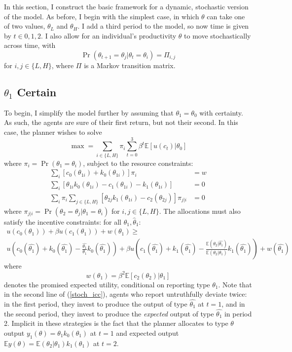 \documentclass[11pt]{article}
\newcommand{\ev}{\mathbb{E}}
\begin{document}
In this section, I construct the basic framework for a dynamic, stochastic version of the model. As before, I begin with the simplest case, in which \( \theta \) can take one of two values, \( \theta_L \) and \( \theta_H \). I add a third period to the model, so now time is given by \( t\in 0, 1, 2 \). I also allow for an individual's productivity \( \theta \) to move stochastically across time, with
\[ \Pr(\theta_{t+1} = \theta_j | \theta_t = \theta_i) = \Pi_{i,j} \]
for \( i,j\in\{L,H\} \), where \( \Pi \) is a Markov transition matrix. 

\subsection{\( \theta_1 \) Certain}

To begin, I simplify the model further by assuming that \( \theta_1 = \theta_0 \) with certainty. As such, the agents are sure of their first return, but not their second. In this case, the planner wishes to solve 
\begin{equation}
    \max = \sum_{i\in\{L,H\}} \pi_i \sum_{t = 0}^{3}\beta^t\ev [u(c_t) | \theta_0]
\end{equation}
where \( \pi_i = \Pr(\theta_1 = \theta_i) \), subject to the resource constraints:
\begin{align}
    \sum_i [c_0(\theta_{1i}) + k_0(\theta_{1i})]\pi_i &= w \\
    \sum_i [\theta_{1i}k_0(\theta_{1i}) - c_1(\theta_{1i}) - k_1(\theta_{1i})] &= 0 \\
    \sum_i \pi_i \sum_{j\in\{L,H\}}[\theta_{2j}k_1(\theta_{1i}) - c_2(\theta_{2j})]\pi_{j|i} &= 0
\end{align}
where \( \pi_{j|i} = \Pr(\theta_2 = \theta_j | \theta_1 = \theta_i) \) for \( i,j\in\{L,H\} \). The allocations must also satisfy the incentive constraints: for all \( \theta_1, \hat{\theta}_1 \): 
\begin{multline}
    u(c_0(\theta_1)) + \beta u(c_1(\theta_1)) + w(\theta_1) \geq \\
    u\left(c_0(\hat{\theta_1}) + k_0(\hat{\theta_1}) - \frac{\hat{\theta_1}}{\theta_1}k_0(\hat{\theta_1})\right) + \beta u\left( c_1(\hat{\theta_1}) + k_1(\hat{\theta_1}) - \frac{\ev(\theta_2|\hat{\theta_1})}{\ev(\theta_2 | \theta_1)}k_1(\hat{\theta_1}) \right) + w(\hat{\theta_1}) \label{stoch_icc}
\end{multline}
where 
\begin{equation}
    w(\theta_1) = \beta^2 \ev[c_2(\theta_2) | \theta_1]
\end{equation}
denotes the promised expected utility, conditional on reporting type \( \theta_1 \). Note that in the second line of (\ref{stoch_icc}), agents who report untruthfully deviate twice: in the first period, they invest to produce the output of type \( \hat{\theta_1} \) at \( t = 1 \), and in the second period, they invest to produce the \textit{expected} output of type \( \hat{\theta_1} \) in period 2. Implicit in these strategies is the fact that the planner allocates to type \( \theta \) output \( y_1(\theta) = \theta_1 k_0(\theta_1) \) at \( t = 1 \) and expected output \( \ev y(\theta) = \ev(\theta_2 | \theta_1)k_1(\theta_1) \) at \( t = 2 \). 
\end{document}
